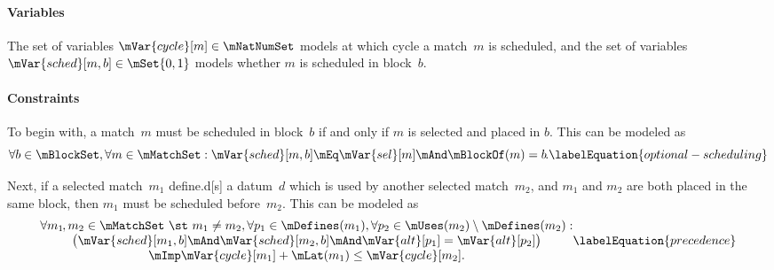 \paragraph{Variables}

The set of \glspl{variable} \mbox{$\mVar{cycle}[m] \in \mNatNumSet$} models at
which cycle a \gls{match}~$m$ is scheduled, and the set of \glspl{variable}
\mbox{$\mVar{sched}[m, b] \in \mSet{0, 1}$} models whether $m$ is scheduled in
\gls{block}~$b$\hspace{-1pt}.


\paragraph{Constraints}

To begin with, a \gls{match}~$m$ must be scheduled in \gls{block}~$b$ if and
only if $m$ is selected and placed in $b$\hspace{-1pt}.
%
This can be modeled as
%
\begin{equation}
  \forall b \in \mBlockSet,
  \forall m \in \mMatchSet :
  \mVar{sched}[m, b]
  \mEq
  \mVar{sel}[m] \mAnd \mBlockOf(m) = b \hspace{-1pt}.
  \labelEquation{optional-scheduling}
\end{equation}

Next, if a selected \gls{match}~$m_1$ \gls{define.d}[s] a \gls{datum}~$d$ which
is used by another selected \gls{match}~$m_2$, and $m_1$ and $m_2$ are both
placed in the same \gls{block}, then $m_1$ must be scheduled before~$m_2$.
%
This can be modeled as
%
\begin{equation}
  \begin{array}{@{}c@{}}
    \forall m_1 \hspace{-1pt}, m_2 \in \mMatchSet \text{ \st } m_1 \neq m_2,
    \forall p_1 \in \mDefines(m_1),
    \forall p_2 \in \mUses(m_2) \setminus \mDefines(m_2) : \\
    \big(
      \mVar{sched}[m_1, b] \mAnd \mVar{sched}[m_2, b]
      \mAnd \mVar{alt}[p_1] = \mVar{alt}[p_2]
    \big) \\
    \mbox{} \mImp
    \mVar{cycle}[m_1] + \mLat(m_1) \leq \mVar{cycle}[m_2].
  \end{array}
  \labelEquation{precedence}
\end{equation}

